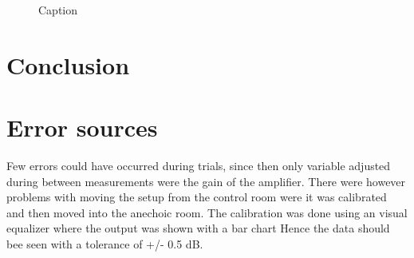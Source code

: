 \begin{figure}[H]
	\centering
	
	\caption{Caption }
	\label{fig:FFTAcceptTest}
\end{figure}


\section{Conclusion}

\section{Error sources}

Few errors could have occurred during trials, since then only variable adjusted during between measurements were the gain of the amplifier. There were however problems with moving the setup from the control room were it was calibrated and then moved into the anechoic room. The calibration was done using an visual equalizer where the output was shown with a bar chart Hence the data should bee seen with a tolerance of +/- 0.5 dB.